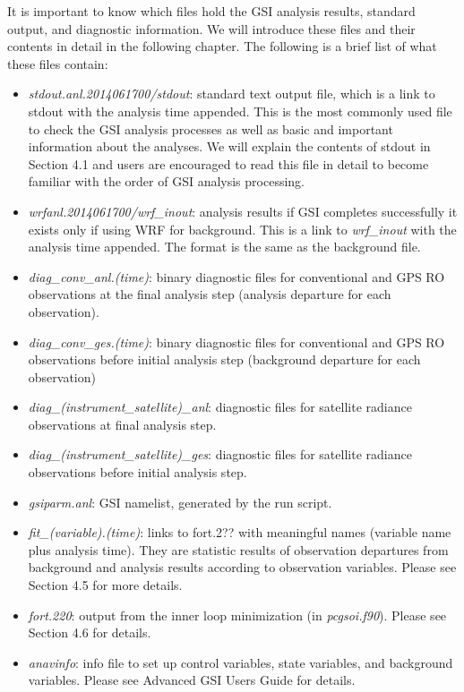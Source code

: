 It is important to know which files hold the GSI analysis results, standard output, and diagnostic information. We will introduce these files and their contents in detail in the following chapter. The following is a brief list of what these files contain:
\begin{itemize}
\item \textit{stdout.anl.2014061700/stdout}: standard text output file, which is a link to stdout with the analysis time appended. This is the most commonly used file to check the GSI analysis processes as well as basic and important information about the analyses. We will explain the contents of stdout in Section 4.1 and users are encouraged to read this file in detail to become familiar with the order of GSI analysis processing.
\item \textit{wrfanl.2014061700/wrf\_inout}: analysis results if GSI completes successfully \- it exists only if using WRF for background. This is a link to \textit{wrf\_inout} with the analysis time appended. The format is the same as the background file.
\item \textit{diag\_conv\_anl.(time)}: binary diagnostic files for conventional and GPS RO observations at the final analysis step (analysis departure for each observation). 
\item \textit{diag\_conv\_ges.(time)}: binary diagnostic files for conventional and GPS RO observations before initial analysis step (background departure for each observation)
\item \textit{diag\_(instrument\_satellite)\_anl}: diagnostic files for satellite radiance observations at final analysis step. 
\item \textit{diag\_(instrument\_satellite)\_ges}: diagnostic files for satellite radiance observations before initial analysis step.
\item \textit{gsiparm.anl}:   GSI namelist, generated by the run script.
\item \textit{fit\_(variable).(time)}: links to fort.2?? with meaningful names (variable name plus analysis time). They are statistic results of observation departures from background and analysis results according to observation variables. Please see Section 4.5 for more details. 
\item \textit{fort.220}:  output from the inner loop minimization (in \textit{pcgsoi.f90}). Please see Section 4.6 for details.
\item \textit{anavinfo}: info file to set up control variables, state variables, and background variables. Please see Advanced GSI User\textquotesingle s Guide for details.

\end{itemize}
